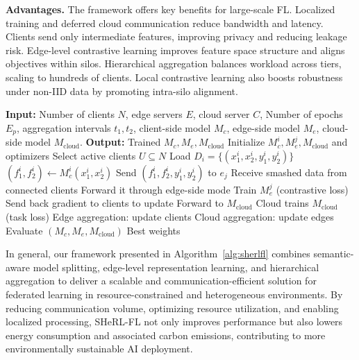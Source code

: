 \documentclass[letterpaper]{article} %
\begin{document}
    \textbf{Advantages.} The framework offers key benefits for large-scale FL. Localized training and deferred cloud communication reduce bandwidth and latency. Clients send only intermediate features, improving privacy and reducing leakage risk. Edge-level contrastive learning improves feature space structure and aligns objectives within silos. Hierarchical aggregation balances workload across tiers, scaling to hundreds of clients. Local contrastive learning also boosts robustness under non-IID data by promoting intra-silo alignment.
    \begin{algorithm}[!ht]
        \caption{SHeRL-FL Training}
        \label{alg:sherlfl}
        \begin{algorithmic}[1]
            \State \textbf{Input:} Number of clients $N$, edge servers $E$, cloud server $C$, Number of epochs $E_p$, aggregation intervals $t_1, t_2$, client-side model $M_c$, edge-side model $M_e$, cloud-side model $M_{\mathrm{cloud}}$.
            \State \textbf{Output:} Trained $M_c, M_e, M_{\mathrm{cloud}}$
            \State Initialize $M_c^i, M_e^j, M_{\mathrm{cloud}}$ and optimizers
                \State Select active clients $U \subseteq N$
                    \State Load $D_i=\{(x^i_1,x^i_2,y^i_1,y^i_2)\}$
                    \State $(f^i_1,f^i_2)\gets M_c^i(x^i_1,x^i_2)$
                    \State Send $(f^i_1,f^i_2,y^i_1,y^i_2)$ to $e_j$
                \EndFor
                    \State Receive smashed data from connected clients  
                    \State Forward it through edge-side mode
                    \State Train $M_e^j$ (contrastive loss)
                    \State Send back gradient to clients to update
                    \State Forward to $M_{\mathrm{cloud}}$
                \EndFor
                \State Cloud trains $M_{\mathrm{cloud}}$ (task loss)
                    \State Edge aggregation: update clients
                \EndIf
                    \State Cloud aggregation: update edges
                \EndIf
                \State Evaluate $(M_c,M_e,M_{\mathrm{cloud}})$
            \EndFor
            \State \Return Best weights
        \end{algorithmic}
    \end{algorithm}
    
     In general, our framework presented in Algorithm~\ref{alg:sherlfl} combines semantic-aware model splitting, edge-level representation learning, and hierarchical aggregation to deliver a scalable and communication-efficient solution for federated learning in resource-constrained and heterogeneous environments. By reducing communication volume, optimizing resource utilization, and enabling localized processing, SHeRL-FL not only improves performance but also lowers energy consumption and associated carbon emissions, contributing to more environmentally sustainable AI deployment.
\end{document}
